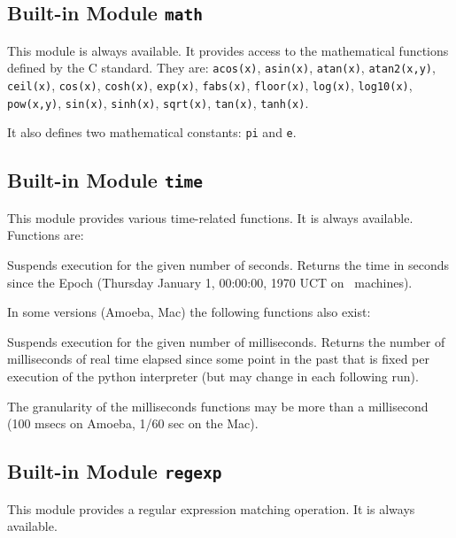 \subsection{Built-in Module {\tt math}}

This module is always available.
It provides access to the mathematical functions defined by the C
standard.
They are:
{\tt acos(x)},
{\tt asin(x)},
{\tt atan(x)},
{\tt atan2(x,y)},
{\tt ceil(x)},
{\tt cos(x)},
{\tt cosh(x)},
{\tt exp(x)},
{\tt fabs(x)},
{\tt floor(x)},
{\tt log(x)},
{\tt log10(x)},
{\tt pow(x,y)},
{\tt sin(x)},
{\tt sinh(x)},
{\tt sqrt(x)},
{\tt tan(x)},
{\tt tanh(x)}.

It also defines two mathematical constants:
{\tt pi}
and
{\tt e}.

\subsection{Built-in Module {\tt time}}

This module provides various time-related functions.
It is always available.
Functions are:
\begin{description}
Suspends execution for the given number of seconds.
Returns the time in seconds since the Epoch (Thursday January 1,
00:00:00, 1970 UCT on \UNIX\ machines).
\end{description}

\noindent
In some versions (Amoeba, Mac) the following functions also exist:
\begin{description}
Suspends execution for the given number of milliseconds.
Returns the number of milliseconds of real time elapsed since some point
in the past that is fixed per execution of the python interpreter (but
may change in each following run).
\end{description}

\noindent
The granularity of the milliseconds functions may be more than a
millisecond (100 msecs on Amoeba, 1/60 sec on the Mac).

\subsection{Built-in Module {\tt regexp}}

This module provides a regular expression matching operation.
It is always available.

